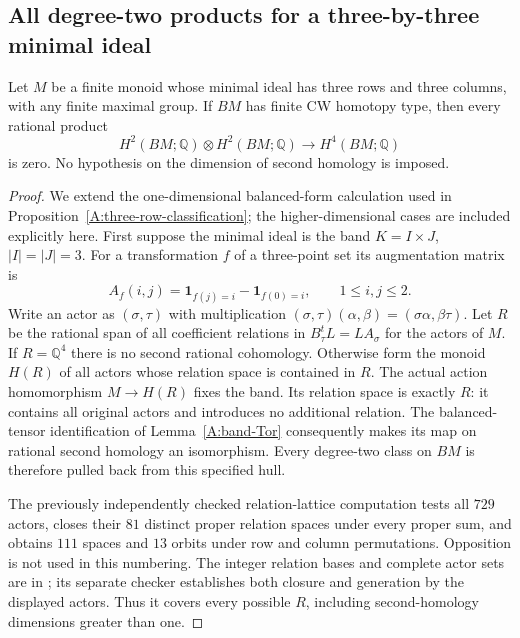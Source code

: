 \subsection{All degree-two products for a three-by-three minimal ideal}

\begin{theorem}
\label{CP2:A-three-by-three-all-products}
Let $M$ be a finite monoid whose minimal ideal has three rows and
three columns, with any finite maximal group. If $BM$ has finite
CW homotopy type, then every rational product
\[
 H^2(BM;\mathbb Q)\otimes H^2(BM;\mathbb Q)
 \longrightarrow H^4(BM;\mathbb Q)
\]
is zero. No hypothesis on the dimension of second homology is imposed.
\end{theorem}
\begin{proof}
We extend the one-dimensional balanced-form calculation used in
Proposition~\ref{A:three-row-classification}; the higher-dimensional
cases are included explicitly here. First suppose the minimal ideal
is the band $K=I\times J$, $|I|=|J|=3$. For a transformation $f$
of a three-point set its augmentation matrix is
\[
 A_f(i,j)=\mathbf1_{f(j)=i}-\mathbf1_{f(0)=i},
 \qquad 1\le i,j\le2.
\]
Write an actor as $(\sigma,\tau)$ with multiplication
$(\sigma,\tau)(\alpha,\beta)=(\sigma\alpha,\beta\tau)$.
Let $R$ be the rational span of all coefficient relations in
$B_\tau^tL=LA_\sigma$ for the actors of $M$. If $R=\mathbb Q^4$
there is no second rational cohomology. Otherwise form the monoid
$H(R)$ of all actors whose relation space is contained in $R$.
The actual action homomorphism $M\to H(R)$ fixes the band.
Its relation space is exactly $R$: it contains all original actors
and introduces no additional relation. The balanced-tensor
identification of Lemma~\ref{A:band-Tor} consequently makes its
map on rational second homology an isomorphism. Every degree-two
class on $BM$ is therefore pulled back from this specified hull.

The previously independently checked relation-lattice computation
tests all $729$ actors, closes their $81$ distinct proper relation
spaces under every proper sum, and obtains $111$ spaces and $13$
orbits under row and column permutations. Opposition is not used
in this numbering. The integer relation bases and complete actor
sets are in ;
its separate checker establishes both closure and generation by
the displayed actors. Thus it covers every possible $R$, including
second-homology dimensions greater than one.


\end{proof}

